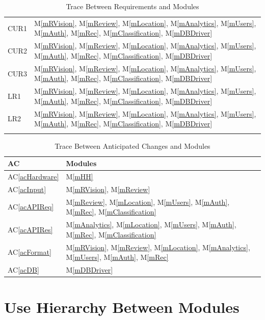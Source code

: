 \documentclass[12pt, titlepage]{article}
\newcommand{\acref}[1]{AC\ref{#1}}
\newcommand{\mref}[1]{M\ref{#1}}
\begin{document}
\begin{longtable}{p{} p{}}
CUR1 & \mref{mRVision}, \mref{mReview}, \mref{mLocation}, \mref{mAnalytics}, \mref{mUsers}, \mref{mAuth}, \mref{mRec}, \mref{mClassification}, \mref{mDBDriver}\\
CUR2 & \mref{mRVision}, \mref{mReview}, \mref{mLocation}, \mref{mAnalytics}, \mref{mUsers}, \mref{mAuth}, \mref{mRec}, \mref{mClassification}, \mref{mDBDriver}\\
CUR3 & \mref{mRVision}, \mref{mReview}, \mref{mLocation}, \mref{mAnalytics}, \mref{mUsers}, \mref{mAuth}, \mref{mRec}, \mref{mClassification}, \mref{mDBDriver}\\
LR1 & \mref{mRVision}, \mref{mReview}, \mref{mLocation}, \mref{mAnalytics}, \mref{mUsers}, \mref{mAuth}, \mref{mRec}, \mref{mClassification}, \mref{mDBDriver}\\
LR2 & \mref{mRVision}, \mref{mReview}, \mref{mLocation}, \mref{mAnalytics}, \mref{mUsers}, \mref{mAuth}, \mref{mRec}, \mref{mClassification}, \mref{mDBDriver}\\
\bottomrule
\caption{Trace Between Requirements and Modules}
\label{TblRT}
\end{longtable}

\begin{table}[H]
\centering
\begin{tabular}{p{} p{}}
\toprule
\textbf{AC} & \textbf{Modules}\\
\midrule
\acref{acHardware} & \mref{mHH}\\
\acref{acInput} & \mref{mRVision}, \mref{mReview}\\
\acref{acAPIReq} & \mref{mReview}, \mref{mLocation}, \mref{mUsers}, \mref{mAuth}, \mref{mRec}, \mref{mClassification}\\
\acref{acAPIRes} & \mref{mAnalytics}, \mref{mLocation}, \mref{mUsers}, \mref{mAuth}, \mref{mRec}, \mref{mClassification}\\
\acref{acFormat} & \mref{mRVision}, \mref{mReview}, \mref{mLocation}, \mref{mAnalytics}, \mref{mUsers}, \mref{mAuth}, \mref{mRec}\\
\acref{acDB} & \mref{mDBDriver}\\
\bottomrule
\end{tabular}
\caption{Trace Between Anticipated Changes and Modules}
\label{TblACT}
\end{table}

\section{Use Hierarchy Between Modules} \label{SecUse}
\end{document}
